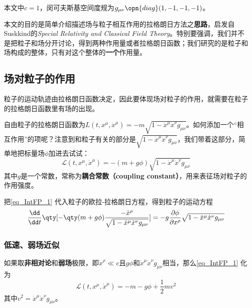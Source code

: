 

本文中$c=1$，闵可夫斯基空间度规为$g_{\mu\nu}\opn{diag}(1, -1, -1, -1)$。

本文的目的是简单介绍描述场与粒子相互作用的拉格朗日方法之\textbf{思路}，启发自Suskkind的\textsl{Special Relativity and Classical Field Theory}\cite{SusskindClassicalFields}。特别要强调，我们并不是把粒子和场分开讨论，得到两种作用量或者拉格朗日函数；我们研究的是粒子和场构成的整体，只有对这个整体的\textbf{一个}作用量。

\subsection{场对粒子的作用}

粒子的运动轨迹由拉格朗日函数决定，因此要体现场对粒子的作用，就需要在粒子的拉格朗日函数里有场的出现。

自由粒子的拉格朗日函数为$L(t, x^\mu, \dot{x}^\mu ) = -m\sqrt{1-\dot{x}^\mu \dot{x}^\nu g_{\mu\nu}}$。如何添加一个“相互作用”的项呢？注意到和粒子有关的部分是$\sqrt{1-\dot{x}^\mu \dot{x}^\nu g_{\mu\nu}}$，我们带着这部分，简单地把标量场$\phi$加进去试试：
\begin{equation}\label{eq_IntFP_1}
\mathcal{L}(t, x^\mu, \dot{x}^\mu ) = -(m+g\phi)\sqrt{1-\dot{x}^\mu \dot{x}^\nu g_{\mu\nu}}
\end{equation}
其中$g$是一个常数，常称为\textbf{耦合常数（coupling constant）}，用来表征场对粒子的作用强度。

把\autoref{eq_IntFP_1} 代入粒子的欧拉-拉格朗日方程，得到粒子的运动方程
\begin{equation}\label{eq_IntFP_2}
\frac{\dd }{\dd t} \qty[-\qty(m+g\phi)\frac{-\dot{x}^\rho}{\sqrt{1-\dot{x}^\mu \dot{x}^\nu g_{\mu\nu}}}] = -g\frac{\partial \phi}{\partial x^\rho}\sqrt{1-\dot{x}^\mu \dot{x}^\nu g_{\mu\nu}}
\end{equation}


\subsubsection{低速、弱场近似}

如果取\textbf{非相对论}和\textbf{弱场}极限，即$\dot{x}^\rho\ll c$且$g\phi$和$\dot{x}^\mu \dot{x}^\nu g_{\mu\nu}$相当，那么\autoref{eq_IntFP_1} 化为
\begin{equation}\label{eq_IntFP_3}
\mathcal{L}(t, x^\mu, \dot{x}^\mu ) = -m-g\phi+\frac{1}{2}mv^2
\end{equation}
其中$v^2=\dot{x}^\mu \dot{x}^\nu g_{\mu\nu}$。

